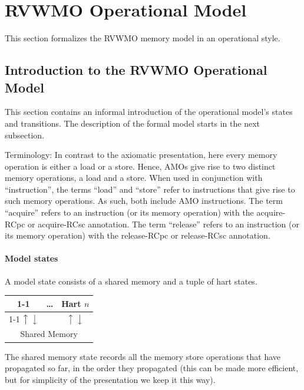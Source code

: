 \section{RVWMO Operational Model}\label{sec:omm:pseudocode_exec}

This section formalizes the RVWMO memory model in an operational style.

\subsection{Introduction to the RVWMO Operational Model}

This section contains an informal introduction of the operational model's states and transitions.
The description of the formal model starts in the next subsection.


Terminology: In contrast to the axiomatic presentation, here every memory operation is either a load or a store.
Hence, AMOs give rise to two distinct memory operations, a load and a store.
When used in conjunction with ``instruction'', the terms ``load'' and ``store'' refer to instructions that give rise to such memory operations.
As such, both include AMO instructions.
The term ``acquire'' refers to an instruction (or its memory operation) with the acquire-RCpc or acquire-RCsc annotation.
The term ``release'' refers to an instruction (or its memory operation) with the release-RCpc or release-RCsc annotation.

\paragraph{Model states}
A model state consists of a shared memory and a tuple of hart states.
\begin{center}
\sffamily
\begin{tabular}{ccc}
\cline{1-1}\cline{3-3}
\multicolumn{1}{|c|}{Hart 0} & \bf \dots & \multicolumn{1}{|c|}{Hart $n$} \\
\cline{1-1}\cline{3-3}
$\big\uparrow$ $\big\downarrow$ & & $\big\uparrow$ $\big\downarrow$ \\
\hline
\multicolumn{3}{|c|}{Shared Memory} \\
\hline
\end{tabular}
\end{center}
The shared memory state records all the memory store operations that have propagated so far, in the order they propagated (this can be made more efficient, but for simplicity of the presentation we keep it this way).

